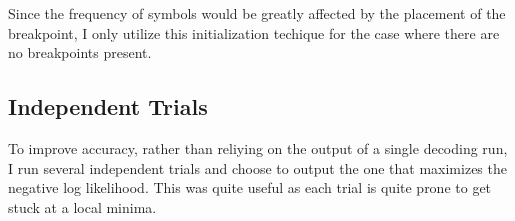 \documentclass{siamart190516}
\begin{document}
Since the frequency of symbols would be greatly affected by the placement of the breakpoint, I only utilize this initialization techique for the case where there are no breakpoints present.


\subsection{Independent Trials}
To improve accuracy, rather than reliying on the output of a single decoding run, I run several independent trials and choose to output the one that maximizes the negative log likelihood. This was quite useful as each trial is quite prone to get stuck at a local minima.
\end{document}
